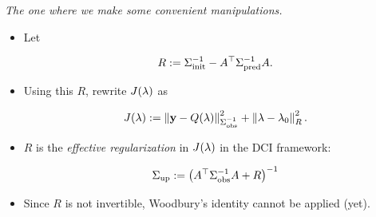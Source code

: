 \begin{frame}[t]{\it The one where we make some convenient manipulations.}
\begin{itemize}
  \item Let

  \begin{equation}\label{eq:eff_reg}
  	R := \nolinebreak \initialCov^{-1} - \nolinebreak A^\top \predictedCov^{-1} A.
  \end{equation}

  \bigskip
  \item Using this $R$, rewrite $J(\lambda)$ as

  \begin{equation}\label{eq:dci-objective-alt}
  J(\lambda):= \left\Vert\mathbf{y} - Q(\lambda)\right\Vert_{\Sigma_\text{obs}^{-1}}^2 + \left\Vert\lambda - \lambda_0\right\Vert_{R}^2.
  \end{equation}

  \bigskip
  \item $R$ is the {\em effective regularization} in $J(\lambda)$ in the DCI framework:

  \begin{equation}
  	\Sigma_\text{up} := \left(A^\top \Sigma_\text{obs}^{-1} A + R\right)^{-1}
  \end{equation}

  \bigskip
  \item Since $R$ is not invertible, Woodbury's identity cannot be applied (yet).

\end{itemize}

\end{frame}

